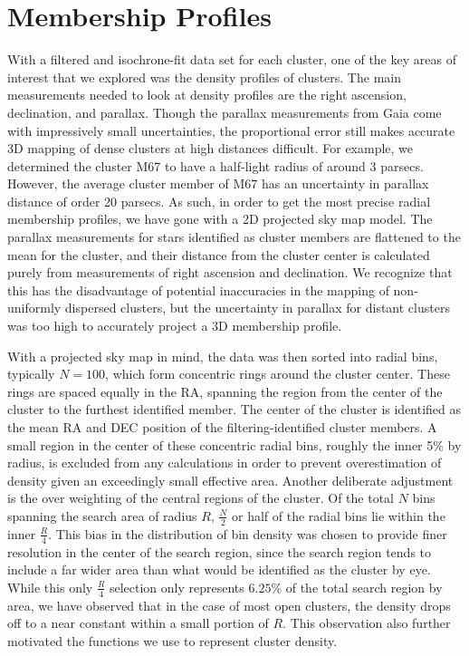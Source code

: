 \documentclass[onecolumn,table,xcdraw,super]{aastex631}
\begin{document}
\section{Membership Profiles} \label{sec:membership}

With a filtered and isochrone-fit data set for each cluster, one of the key areas of interest that we explored was the density profiles of clusters. The main measurements needed to look at density profiles are the right ascension, declination, and parallax. Though the parallax measurements from Gaia come with impressively small uncertainties, the proportional error still makes accurate 3D mapping of dense clusters at high distances difficult. For example, we determined the cluster M67 to have a half-light radius of around 3 parsecs. However, the average cluster member of M67 has an uncertainty in parallax distance of order 20 parsecs. As such, in order to get the most precise radial membership profiles, we have gone with a 2D projected sky map model. The parallax measurements for stars identified as cluster members are flattened to the mean for the cluster, and their distance from the cluster center is calculated purely from measurements of right ascension and declination. We recognize that this has the disadvantage of potential inaccuracies in the mapping of non-uniformly dispersed clusters, but the uncertainty in parallax for distant clusters was too high to accurately project a 3D membership profile.

With a projected sky map in mind, the data was then sorted into radial bins, typically $N=100$, which form concentric rings around the cluster center. These rings are spaced equally in the RA, spanning the region from the center of the cluster to the furthest identified member. The center of the cluster is identified as the mean RA and DEC position of the filtering-identified cluster members. A small region in the center of these concentric radial bins, roughly the inner 5\% by radius, is excluded from any calculations in order to prevent overestimation of density given an exceedingly small effective area. Another deliberate adjustment is the over weighting of the central regions of the cluster. Of the total $N$ bins spanning the search area of radius $R$, $\frac{N}{2}$ or half of the radial bins lie within the inner $\frac{R}{4}$. This bias in the distribution of bin density was chosen to provide finer resolution in the center of the search region, since the search region tends to include a far wider area than what would be identified as the cluster by eye. While this only $\frac{R}{4}$ selection only represents $6.25\%$ of the total search region by area, we have observed that in the case of most open clusters, the density drops off to a near constant within a small portion of $R$. This observation also further motivated the functions we use to represent cluster density.
\end{document}
